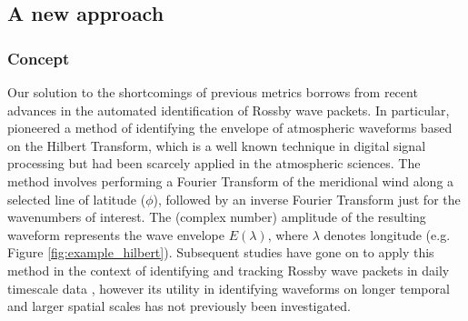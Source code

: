 \subsection{A new approach}

\subsubsection{Concept}

Our solution to the shortcomings of previous metrics borrows from recent advances in the automated identification of Rossby wave packets. In particular, \citet{Zimin2003} pioneered a method of identifying the envelope of atmospheric waveforms based on the Hilbert Transform, which is a well known technique in digital signal processing but had been scarcely applied in the atmospheric sciences. The method involves performing a Fourier Transform of the meridional wind along a selected line of latitude ($\phi$), followed by an inverse Fourier Transform just for the wavenumbers of interest. The (complex number) amplitude of the resulting waveform represents the wave envelope $E(\lambda)$, where $\lambda$ denotes longitude (e.g. Figure \ref{fig:example_hilbert}). Subsequent studies have gone on to apply this method in the context of identifying and tracking Rossby wave packets in daily timescale data \citep{Glatt2014,Souders2014a}, however its utility in identifying waveforms on longer temporal and larger spatial scales has not previously been investigated.